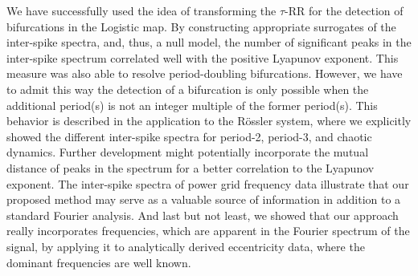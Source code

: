 \documentclass[entropy,article,submit,pdftex,moreauthors]{Definitions/mdpi}
\begin{document}
We have successfully used the idea of transforming the $\tau$-RR for the detection of bifurcations in the Logistic map. By constructing appropriate surrogates of the inter-spike spectra, 
and, thus, a null model, the number of significant peaks in the inter-spike spectrum correlated well with the positive Lyapunov exponent. This measure was also able to resolve 
period-doubling bifurcations. However, we have to admit this way the detection of a bifurcation is only possible when the additional period(s) is not an integer multiple of the former period(s). 
This behavior is described in the application to the R\"ossler system, where we explicitly showed the different inter-spike spectra for period-2, period-3, and chaotic dynamics.
Further development might potentially incorporate the mutual distance of peaks in the spectrum for a better correlation to the Lyapunov exponent. The inter-spike spectra of power grid 
frequency data illustrate that our proposed method may serve as a valuable source of information in addition to a standard Fourier analysis. And last but not least, we showed that our approach 
really incorporates frequencies, which are apparent in the Fourier spectrum of the signal, by applying it to analytically derived eccentricity data, where the dominant frequencies are well 
known.
\end{document}
